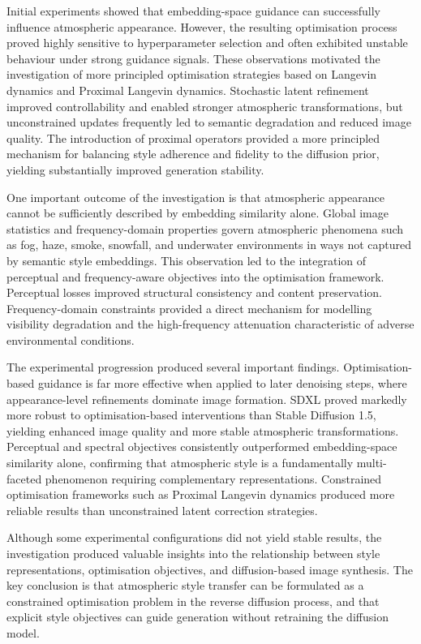 Initial experiments showed that embedding-space guidance can successfully influence atmospheric appearance. However, the resulting optimisation process proved highly sensitive to hyperparameter selection and often exhibited unstable behaviour under strong guidance signals. These observations motivated the investigation of more principled optimisation strategies based on Langevin dynamics and Proximal Langevin dynamics. Stochastic latent refinement improved controllability and enabled stronger atmospheric transformations, but unconstrained updates frequently led to semantic degradation and reduced image quality. The introduction of proximal operators provided a more principled mechanism for balancing style adherence and fidelity to the diffusion prior, yielding substantially improved generation stability.

One important outcome of the investigation is that atmospheric appearance cannot be sufficiently described by embedding similarity alone. Global image statistics and frequency-domain properties govern atmospheric phenomena such as fog, haze, smoke, snowfall, and underwater environments in ways not captured by semantic style embeddings. This observation led to the integration of perceptual and frequency-aware objectives into the optimisation framework. Perceptual losses improved structural consistency and content preservation. Frequency-domain constraints provided a direct mechanism for modelling visibility degradation and the high-frequency attenuation characteristic of adverse environmental conditions.

The experimental progression produced several important findings. Optimisation-based guidance is far more effective when applied to later denoising steps, where appearance-level refinements dominate image formation. SDXL proved markedly more robust to optimisation-based interventions than Stable Diffusion 1.5, yielding enhanced image quality and more stable atmospheric transformations. Perceptual and spectral objectives consistently outperformed embedding-space similarity alone, confirming that atmospheric style is a fundamentally multi-faceted phenomenon requiring complementary representations. Constrained optimisation frameworks such as Proximal Langevin dynamics produced more reliable results than unconstrained latent correction strategies.

Although some experimental configurations did not yield stable results, the investigation produced valuable insights into the relationship between style representations, optimisation objectives, and diffusion-based image synthesis. The key conclusion is that atmospheric style transfer can be formulated as a constrained optimisation problem in the reverse diffusion process, and that explicit style objectives can guide generation without retraining the diffusion model.

